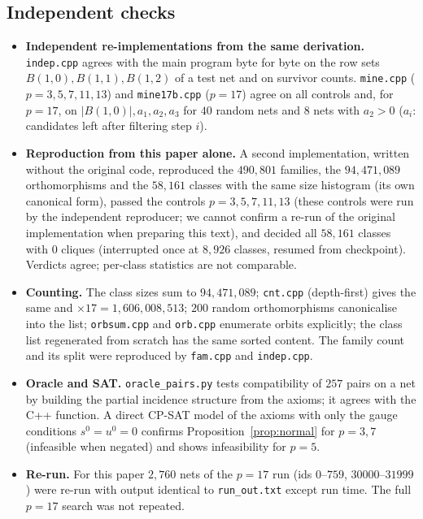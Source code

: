 \documentclass[11pt,a4paper]{article}
\theoremstyle{definition}
\begin{document}
\subsection{Independent checks}
\begin{itemize}[leftmargin=*,itemsep=1pt]
\item \textbf{Independent re-implementations from the same derivation.} \texttt{indep.cpp} agrees with the main program byte for byte on the row sets $B(1,0),B(1,1),B(1,2)$ of a test net and on survivor counts. \texttt{mine.cpp} ($p=3,5,7,11,13$) and \texttt{mine17b.cpp} ($p=17$) agree on all controls and, for $p=17$, on $|B(1,0)|,a_1,a_2,a_3$ for $40$ random nets and $8$ nets with $a_2>0$ ($a_i$: candidates left after filtering step $i$).
\item \textbf{Reproduction from this paper alone.} A second implementation, written without the original code, reproduced the $490{,}801$ families, the $94{,}471{,}089$ orthomorphisms and the $58{,}161$ classes with the same size histogram (its own canonical form), passed the controls $p=3,5,7,11,13$ (these controls were run by the independent reproducer; we cannot confirm a re-run of the original implementation when preparing this text), and decided all $58{,}161$ classes with $0$ cliques (interrupted once at $8{,}926$ classes, resumed from checkpoint). Verdicts agree; per-class statistics are not comparable.
\item \textbf{Counting.} The class sizes sum to $94{,}471{,}089$; \texttt{cnt.cpp} (depth-first) gives the same and $\times17=1{,}606{,}008{,}513$; $200$ random orthomorphisms canonicalise into the list; \texttt{orbsum.cpp} and \texttt{orb.cpp} enumerate orbits explicitly; the class list regenerated from scratch has the same sorted content. The family count and its split were reproduced by \texttt{fam.cpp} and \texttt{indep.cpp}.
\item \textbf{Oracle and SAT.} \texttt{oracle\_pairs.py} tests compatibility of $257$ pairs on a net by building the partial incidence structure from the axioms; it agrees with the C++ function. A direct CP-SAT model of the axioms with only the gauge conditions $s^0=u^0=0$ confirms Proposition~\ref{prop:normal} for $p=3,7$ (infeasible when negated) and shows infeasibility for $p=5$.
\item \textbf{Re-run.} For this paper $2{,}760$ nets of the $p=17$ run (ids $0$--$759$, $30000$--$31999$) were re-run with output identical to \texttt{run\_out.txt} except run time. The full $p=17$ search was not repeated.
\end{itemize}
\end{document}
